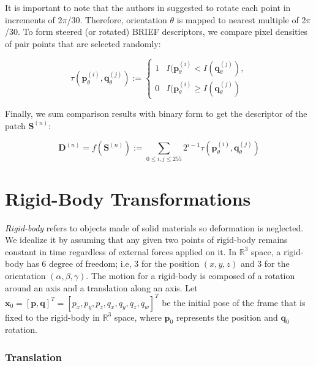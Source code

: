 \documentclass[a4paper]{report}
\numberwithin{figure}{section}
\newcommand{\R}{\mathbb{R}}
\begin{document}
\begin{enumerate}
	It is important to note that the authors in \parencite{Rublee2011a} 
	suggested 
	to rotate each point in increments of 2$\pi$/30. Therefore, orientation 
	$\theta$ is mapped to nearest multiple of 2$\pi$/30. To form steered (or 
	rotated) BRIEF descriptors, we compare pixel densities of pair points that 
	are selected randomly:
	
	\begin{equation*}
	\tau(\mathbf{p}^{(i)}_{\theta},\mathbf{q}^{(j)}_{\theta}) := 
	\begin{cases}
	1  & I(\mathbf{p}^{(i)}_{\theta} < I(\mathbf{q}^{(j)}_{\theta}),\\
	0  & I(\mathbf{p}^{(i)}_{\theta} \geq I(\mathbf{q}^{(j)}_{\theta})
	\end{cases}
	\end{equation*}
	
	Finally, we sum comparison results with binary form to get the descriptor  
	of the patch $\mathbf{S}^{(n)}$:
	
	\begin{equation}
	\mathbf{D}^{(n)} = f(\mathbf{S}^{(n)}) := \sum_{0\leq i,j \leq 255} 
	2^{i-1}\tau (\mathbf{p}^{(i)}_{\theta},\mathbf{q}^{(j)}_{\theta})
	\end{equation}
	
\end{enumerate}




\section{Rigid-Body Transformations} \label{sc_rigid_body_transformations}

\textit{Rigid-body} refers to objects made of solid materials so deformation is 
neglected. We idealize it by assuming that any given two points of 
rigid-body remains constant in time regardless of external forces 
applied on it. In $\R^3$ space, a rigid-body has 6 degree of freedom; i.e, 
3 for the position $(x, y, z)$ and 3 for the orientation $(\alpha, \beta, \gamma)$.
The motion for a rigid-body is composed of a rotation around an axis and 
a translation along an axis. 
Let
$\mathbf{x}_0=[\mathbf{p}, \mathbf{q}]^T=[p_x, p_y, p_z, q_x, q_y, q_z, q_w]^T$
be the initial pose of the frame that is fixed to the rigid-body in $\R^3$ space, 
where $\mathbf{p}_0$ represents the position and $\mathbf{q}_0$ rotation.

\subsubsection{Translation}
\end{document}
